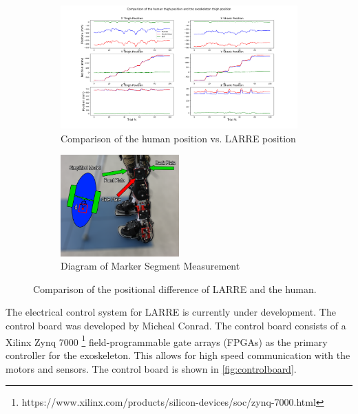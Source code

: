 \begin{figure}[h!]

    \begin{subfigure}{\textwidth}
        \centering
        \captionsetup{justification=centering}
        \centerline{
        \includegraphics[width=\textwidth, frame]{images/mech_design/position_comparison.png}}
        \caption[Comparison of Difference of Human and LARRE Position]{Comparison of the human position vs. LARRE position}
        \label{fig:positioncomparison}
    \end{subfigure}
        \begin{subfigure}{\textwidth}
        \centering
        \captionsetup{justification=centering}
        \centerline{
        \includegraphics[width=0.5\textwidth, frame]{images/mech_design/side_marker_positioning.png}}
        \caption[Diagram of Marker Segment Measurement]{Diagram of Marker Segment Measurement}
        \label{fig:markerpositiondiagram}
    \end{subfigure}
    \caption[Comparison of LARRE and human positions]{Comparison of the positional difference of LARRE and the human.}
    \label{fig:exohumanmarkercompare}
\end{figure}


The electrical control system for LARRE is currently under development. The control board was developed by Micheal Conrad. The control board consists of a  Xilinx Zynq 7000 \footnote{https://www.xilinx.com/products/silicon-devices/soc/zynq-7000.html}  field-programmable gate arrays (FPGAs) as the primary controller for the exoskeleton. This allows for high speed communication with the motors and sensors. The control board is shown in \autoref{fig:controlboard}.


